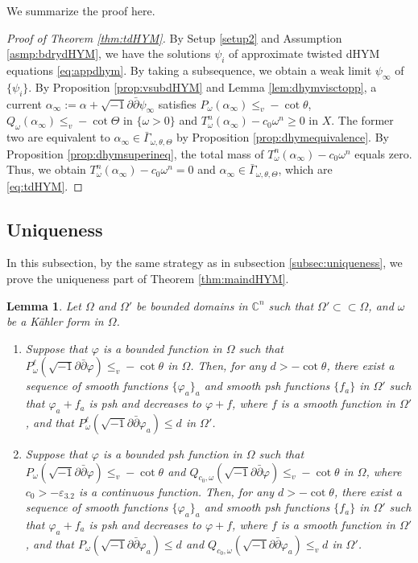 \documentclass{amsart}
\numberwithin{equation}{section}
\theoremstyle{plain}
\newtheorem{lem}[equation]{Lemma}
\theoremstyle{definition}
\theoremstyle{remark}
\newcommand{\delb}{\sqrt{-1}\partial\bar{\partial}}
\begin{document}
We summarize the proof here.
\begin{proof}[Proof of Theorem \ref{thm:tdHYM}]
    By Setup \ref{setup2} and Assumption \ref{asmp:bdrydHYM}, we have the solutions $\psi_i$ of approximate twisted dHYM equations \eqref{eq:appdhym}. By taking a subsequence, we obtain a weak limit $\psi_\infty$ of $\{\psi_i\}$. By Proposition \ref{prop:vsubdHYM} and Lemma \ref{lem:dhymvisctopp}, a current $\alpha_\infty:=\alpha+\delb\psi_\infty$ satisfies $P_\omega(\alpha_\infty)\le_v-\cot\theta$, $Q_\omega(\alpha_\infty)\le_v-\cot\Theta$ in $\{\omega>0\}$ and $T^n_{\omega}(\alpha_\infty)-c_0\omega^n\ge0$ in $X$. The former two are equivalent to $\alpha_\infty\in\bar{\Gamma}_{\omega,\theta,\Theta}$ by Proposition \ref{prop:dhymequivalence}.
    By Proposition \ref{prop:dhymsuperineq}, the total mass of $T^n_\omega(\alpha_\infty)-c_0\omega^n$ equals zero. Thus, we obtain $T^n_\omega(\alpha_\infty)-c_0\omega^n=0$ and $\alpha_\infty\in\bar
    \Gamma_{\omega,\theta,\Theta}$, which are \eqref{eq:tdHYM}.
\end{proof}

\subsection{Uniqueness}\label{subsec:dhymuniqueness}

In this subsection, by the same strategy as in subsection \ref{subsec:uniqueness}, we prove the uniqueness part of Theorem \ref{thm:maindHYM}.

\begin{lem}\label{lem:dhymapp}
    Let $\Omega$ and $\Omega'$ be bounded domains in $\mathbb{C}^n$ such that $\Omega'\subset\subset\Omega$, and $\omega$ be a Kähler form in $\Omega$. \begin{enumerate}[label={\upshape(\roman*)}]
        \item\label{item:dhymappP} Suppose that $\varphi$ is a bounded function in $\Omega$ such that $P^\ell_\omega(\delb\varphi)\le_v-\cot\theta$ in $\Omega$. Then, for any $d>-\cot\theta$, there exist a sequence of smooth functions $\{\varphi_a\}_a$ and smooth psh functions $\{f_a\}$ in $\Omega'$ such that $\varphi_a+f_a$ is psh and decreases to $\varphi+f$, where $f$ is a smooth function in $\Omega'$, and that $P^\ell_\omega(\delb \varphi_a)\le d$ in $\Omega'$.
        \item\label{item:dhymappQ} Suppose that $\varphi$ is a bounded psh function in $\Omega$ such that $P_{\omega}(\delb \varphi)\le_v-\cot\theta$ and $Q_{c_0,\omega}(\delb \varphi)\le_v-\cot\theta$ in $\Omega$, where $c_0>-\varepsilon_{3.2}$ is a continuous function. Then, for any $d>-\cot\theta$, there exist a sequence of smooth functions $\{\varphi_a\}_a$ and smooth psh functions $\{f_a\}$ in $\Omega'$ such that $\varphi_a+f_a$ is psh and decreases to $\varphi+f$, where $f$ is a smooth function in $\Omega'$, and that $P_\omega(\delb \varphi_a)\le d$ and $Q_{c_0,\omega}(\delb \varphi_a)\le_v d$ in $\Omega'$.
    \end{enumerate}
\end{lem}
\end{document}
